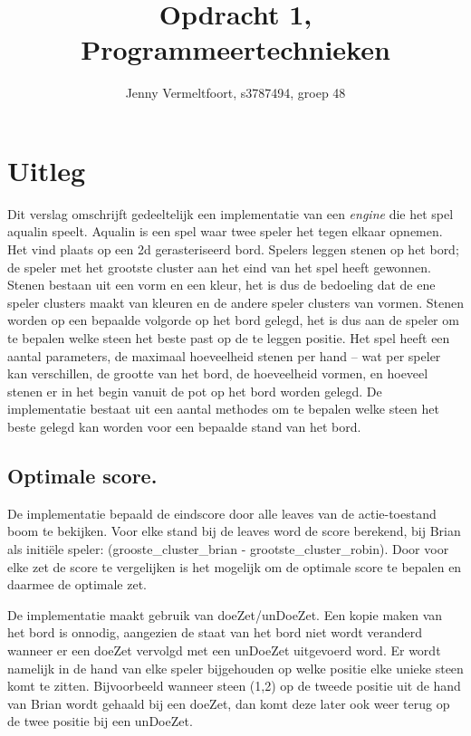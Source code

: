 \documentclass[10pt]{article}
\title{Opdracht 1, Programmeertechnieken}
\author{Jenny Vermeltfoort, s3787494, groep 48}
\begin{document}
\def\tablename{Tabel}

\maketitle

\section{Uitleg}
Dit verslag omschrijft gedeeltelijk een implementatie van een \textit{engine} die het spel aqualin speelt. 
Aqualin is een spel waar twee speler het tegen elkaar opnemen.
Het vind plaats op een 2d gerasteriseerd bord.
Spelers leggen stenen op het bord; de speler met het grootste cluster aan het eind van het spel heeft gewonnen.
Stenen bestaan uit een vorm en een kleur, het is dus de bedoeling dat de ene speler clusters maakt van kleuren en de andere speler clusters van vormen.
Stenen worden op een bepaalde volgorde op het bord gelegd, het is dus aan de speler om te bepalen welke steen het beste past op de te leggen positie.
Het spel heeft een aantal parameters, de maximaal hoeveelheid stenen per hand – wat per speler kan verschillen, de grootte van het bord, de hoeveelheid vormen, en hoeveel stenen er in het begin vanuit de pot op het bord worden gelegd. 
De implementatie bestaat uit een aantal methodes om te bepalen welke steen het beste gelegd kan worden voor een bepaalde stand van het bord.


\subsection{Optimale score.}
De implementatie bepaald de eindscore door alle leaves van de actie-toestand boom te bekijken.
Voor elke stand bij de leaves word de score berekend, bij Brian als initi\"ele speler: (grooste\_cluster\_brian - grootste\_cluster\_robin).
Door voor elke zet de score te vergelijken is het mogelijk om de optimale score te bepalen en daarmee de optimale zet.

De implementatie maakt gebruik van doeZet/unDoeZet. 
Een kopie maken van het bord is onnodig, aangezien de staat van het bord niet wordt veranderd wanneer er een doeZet vervolgd met een unDoeZet uitgevoerd word. 
Er wordt namelijk in de hand van elke speler bijgehouden op welke positie elke unieke steen komt te zitten. Bijvoorbeeld wanneer steen (1,2) op de tweede positie uit de hand van Brian wordt gehaald bij een doeZet, dan komt deze later ook weer terug op de twee positie bij een unDoeZet.
\end{document}
